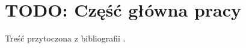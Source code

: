 \chapter{TODO: Część główna pracy}
\label{cha:main}

Treść przytoczona z bibliografii \cite{WhatEveryScientistShouldKnowAboutMemory}.